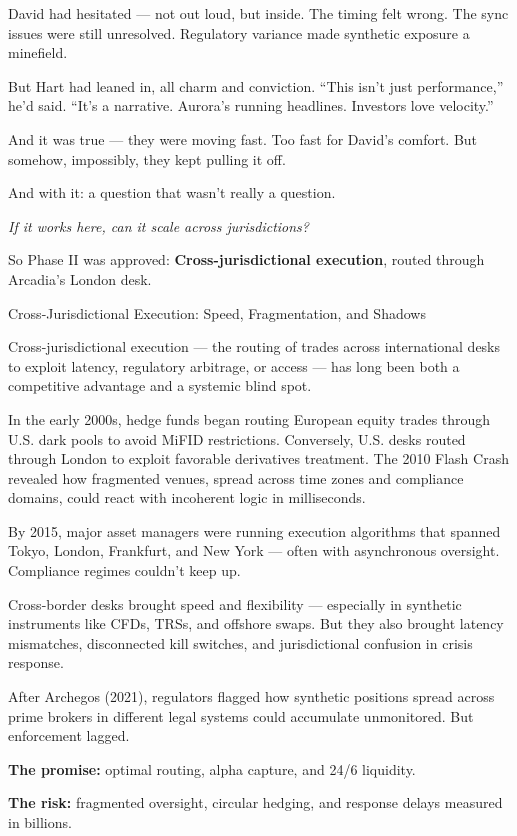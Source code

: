 David had hesitated — not out loud, but inside.
The timing felt wrong. The sync issues were still unresolved. Regulatory variance made synthetic exposure a minefield.

But Hart had leaned in, all charm and conviction.
“This isn’t just performance,” he’d said. “It’s a narrative. Aurora’s running headlines. Investors love velocity.”

And it was true — they were moving fast.
Too fast for David’s comfort.
But somehow, impossibly, they kept pulling it off.

And with it: a question that wasn’t really a question.

\textit{If it works here, can it scale across jurisdictions?}

So Phase II was approved:
\textbf{Cross-jurisdictional execution}, routed through Arcadia’s London desk.

\medskip

\begin{HistoricalSidebar}{Cross-Jurisdictional Execution: Speed, Fragmentation, and Shadows}

  Cross-jurisdictional execution — the routing of trades across international desks to exploit latency, regulatory 
  arbitrage, or access — has long been both a competitive advantage and a systemic blind spot.

  \medskip
  
  In the early 2000s, hedge funds began routing European equity trades through U.S. dark pools to avoid MiFID 
  restrictions. Conversely, U.S. desks routed through London to exploit favorable derivatives treatment. The 2010 
  Flash Crash revealed how fragmented venues, spread across time zones and compliance domains, could react with 
  incoherent logic in milliseconds.

  \medskip
  
  By 2015, major asset managers were running execution algorithms that spanned Tokyo, London, Frankfurt, and New 
  York — often with asynchronous oversight. Compliance regimes couldn’t keep up.

  \medskip
  
  Cross-border desks brought speed and flexibility — especially in synthetic instruments like CFDs, TRSs, and 
  offshore swaps. But they also brought latency mismatches, disconnected kill switches, and jurisdictional confusion 
  in crisis response.

  \medskip
  
  After Archegos (2021), regulators flagged how synthetic positions spread across prime brokers in different legal 
  systems could accumulate unmonitored. But enforcement lagged.

  \medskip
  
  \textbf{The promise:} optimal routing, alpha capture, and 24/6 liquidity.

  \medskip

  \textbf{The risk:} fragmented oversight, circular hedging, and response delays measured in billions.
  
\end{HistoricalSidebar}

